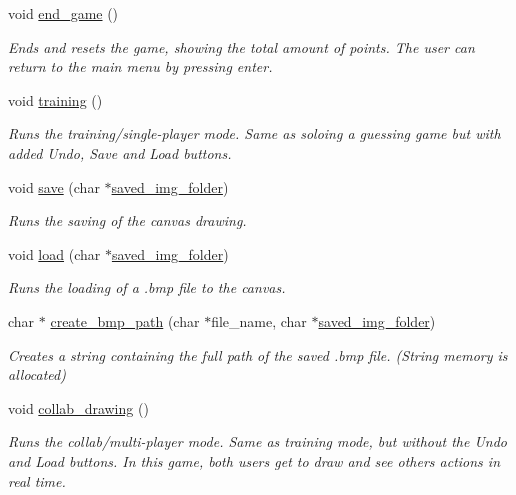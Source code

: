 \begin{DoxyCompactItemize}
void \mbox{\hyperlink{group__pengoo_ga4202fa5c5191c7e387d7570da6c8cd8c}{end\+\_\+game}} ()
\begin{DoxyCompactList}\small\item\em Ends and resets the game, showing the total amount of points. The user can return to the main menu by pressing enter. \end{DoxyCompactList}\item 
void \mbox{\hyperlink{group__pengoo_gae0cdf0dedf98ccbeac43b0300e0d2df1}{training}} ()
\begin{DoxyCompactList}\small\item\em Runs the training/single-\/player mode. Same as soloing a guessing game but with added Undo, Save and Load buttons. \end{DoxyCompactList}\item 
void \mbox{\hyperlink{group__pengoo_ga7be478ae067a8e77c79ece6af6082ce5}{save}} (char $\ast$\mbox{\hyperlink{group__proj_ga0bd738406244c9e2cfb7a40534063a8d}{saved\+\_\+img\+\_\+folder}})
\begin{DoxyCompactList}\small\item\em Runs the saving of the canvas drawing. \end{DoxyCompactList}\item 
void \mbox{\hyperlink{group__pengoo_ga476146a203654a545a8493d3ebeaaf70}{load}} (char $\ast$\mbox{\hyperlink{group__proj_ga0bd738406244c9e2cfb7a40534063a8d}{saved\+\_\+img\+\_\+folder}})
\begin{DoxyCompactList}\small\item\em Runs the loading of a .bmp file to the canvas. \end{DoxyCompactList}\item 
char $\ast$ \mbox{\hyperlink{group__pengoo_ga0c383f0cb382ef07b72894184255e49f}{create\+\_\+bmp\+\_\+path}} (char $\ast$file\+\_\+name, char $\ast$\mbox{\hyperlink{group__proj_ga0bd738406244c9e2cfb7a40534063a8d}{saved\+\_\+img\+\_\+folder}})
\begin{DoxyCompactList}\small\item\em Creates a string containing the full path of the saved .bmp file. (String memory is allocated) \end{DoxyCompactList}\item 
void \mbox{\hyperlink{group__pengoo_gaa5d8d3d5af977d3d9e7141bf2693c81e}{collab\+\_\+drawing}} ()
\begin{DoxyCompactList}\small\item\em Runs the collab/multi-\/player mode. Same as training mode, but without the Undo and Load buttons. In this game, both users get to draw and see other\textquotesingle{}s actions in real time. \end{DoxyCompactList}\item 

\end{DoxyCompactItemize}
